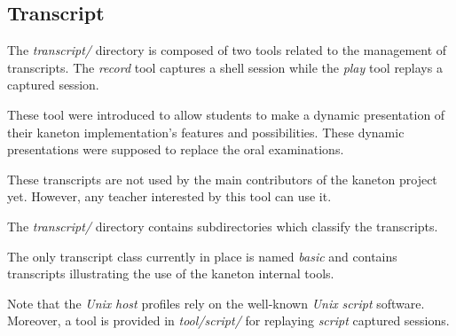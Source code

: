 %
%
%
%
%
%

%
%

\subsection{Transcript}
\label{section:transcript}

The \textit{transcript/} directory is composed of two tools related to
the management of transcripts. The \textit{record} tool captures a
shell session while the \textit{play} tool replays a captured session.

These tool were introduced to allow students to make a dynamic presentation
of their kaneton implementation's features and possibilities. These dynamic
presentations were supposed to replace the oral examinations.

These transcripts are not used by the main contributors of the kaneton
project yet. However, any teacher interested by this tool can use it.

The \textit{transcript/} directory contains subdirectories which classify
the transcripts.

The only transcript class currently in place is named \textit{basic} and
contains transcripts illustrating the use of the kaneton internal tools.

Note that the \textit{Unix} \textit{host} profiles rely on the well-known
\textit{Unix} \textit{script} software. Moreover, a tool is provided in
\textit{tool/script/} for replaying \textit{script} captured sessions.
